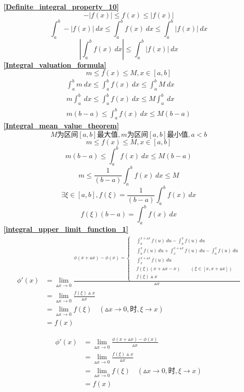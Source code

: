\textbf{\large \ref{Definite_integral_property_10}}
	$$-\left|f(x)\right|\leqslant f(x)\leqslant\left|f(x)\right|$$
	$$\int_{a}^{b} -\left|f(x)\right|\ dx\leqslant \int_{a}^{b}f(x)\ dx\leqslant \int_{a}^{b} \left|f(x)\right| \ dx$$
	$$\left|\int_{a}^{b}f(x)\ dx\right|\leqslant \int_{a}^{b} \left|f(x)\right| \ dx$$
\textbf{\large \ref{Integral_valuation_formula}}
$$m\leqslant f(x)\leqslant M,x\in\left[a,b\right]$$
\begin{align*}
	\int_{a}^{b}m\ dx \leqslant \int_{a}^{b}f(x)\ dx\leqslant \int_{a}^{b}M\ dx\\
	m\int_{a}^{b}\ dx \leqslant \int_{a}^{b}f(x)\ dx\leqslant M\int_{a}^{b}\ dx\\
	m(b-a)\leqslant \int_{a}^{b}f(x)\ dx\leqslant M(b-a)
\end{align*}
\textbf{\large \ref{Integral_mean_value_theorem}}
	$$M\mbox{为区间$\left[a,b\right]$最大值},m\mbox{为区间$\left[a,b\right]$最小值},a<b$$
	$$m\leqslant f(x)\leqslant M,x\in\left[a,b\right]$$
	$$m(b-a)\leqslant \int_{a}^{b}f(x)\ dx\leqslant M(b-a)$$
	$$m\leqslant \frac{1}{(b-a)}\int_{a}^{b}f(x)\ dx\leqslant M$$
	$$\exists \xi\in\left[a,b\right], f(\xi)=\frac{1}{(b-a)}\int_{a}^{b}f(x)\ dx$$
	$$f(\xi)(b-a)=\int_{a}^{b}f(x)\ dx$$
\textbf{\large \ref{integral_upper_limit_function_1}}
\begin{align*}
	\phi'(x)&=\lim\limits_{\vartriangle x\to 0}\frac{\phi(x+\vartriangle x)-\phi(x)=\begin{cases}
			&\int_{a}^{x+\vartriangle x}f(u)\ du-\int_{a}^{x}f(u)\ du\\
			&\int_{a}^{x}f(u)\ du+\int_{x}^{x+\vartriangle x}f(u)\ du-\int_{a}^{x}f(u)\ du\\
			&\int_{x}^{x+\vartriangle x}f(u)\ du\\
			&f(\xi)(x+\vartriangle x-x)\qquad(\xi\in\left[x,x+\vartriangle x\right])\\
			&f(\xi)\vartriangle x
	\end{cases}}{\vartriangle x}\\
	&=\lim\limits_{\vartriangle x\to 0}\frac{f(\xi)\vartriangle x}{\vartriangle x}\\
	&=\lim\limits_{\vartriangle x\to 0}f(\xi)\quad(\vartriangle x\rightarrow 0,\mbox{时},\xi \rightarrow x)\\
	&=f(x)
\end{align*}
\begin{minipage}{.4\textwidth}
	\begin{align*}
		\phi'(x)&=\lim\limits_{\vartriangle x\to 0}\frac{\phi(x+\vartriangle x)-\phi(x)}{\vartriangle x}\\
		&=\lim\limits_{\vartriangle x\to 0}\frac{f(\xi)\vartriangle x}{\vartriangle x}\\
		&=\lim\limits_{\vartriangle x\to 0}f(\xi)\quad(\vartriangle x\rightarrow 0,\mbox{时},\xi \rightarrow x)\\
		&=f(x)
	\end{align*}
\end{minipage}
